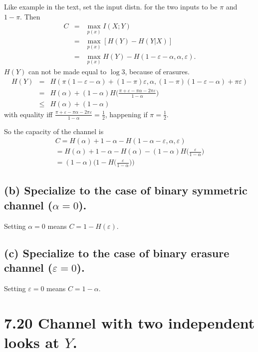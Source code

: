 \documentclass[12pt]{article}
\begin{document}
Like example in the text, set the input distn. for the two inputs to be $\pi$ and $1-\pi$. Then
\begin{eqnarray*}
    C &=& \max_{p(x)}I(X;Y) \\
    &=& \max_{p(x)}[H(Y) - H(Y|X)] \\
    &=& \max_{p(x)}H(Y) - H(1-\varepsilon-\alpha,\alpha,\varepsilon).
\end{eqnarray*}
$H(Y)$ can not be made equal to $\log 3$, because of erasures. 
\begin{eqnarray*}
    H(Y) &=& H( \pi(1-\varepsilon-\alpha) + (1-\pi)\varepsilon,\alpha,(1-\pi)(1-\varepsilon-\alpha) + \pi\varepsilon ) \\
    &=& H(\alpha) + (1-\alpha)H\bigg(\frac{\pi+\varepsilon -\pi\alpha-2\pi\varepsilon}{1-\alpha}\bigg) \\
    &\le& H(\alpha) + (1-\alpha)
\end{eqnarray*}
with equality iff $\frac{\pi+\varepsilon -\pi\alpha-2\pi\varepsilon}{1-\alpha} = \frac{1}{2}$, happening if $\pi = \frac{1}{2}$.

So the capacity of the channel is
\begin{eqnarray*}
    C = H(\alpha) + 1 - \alpha - H(1-\alpha-\varepsilon,\alpha,\varepsilon) \\
    = H(\alpha) + 1 - \alpha - H(\alpha) - (1-\alpha) H\bigg(\frac{\varepsilon}{1-\alpha}\bigg) \\
    = (1-\alpha) \bigg(1 - H\bigg(\frac{\varepsilon}{1-\alpha}\bigg)\bigg)
\end{eqnarray*}

\subsection*{(b) Specialize to the case of binary symmetric channel ($\alpha = 0$).}

Setting $\alpha = 0$ means $C=1-H(\varepsilon)$.

\subsection*{(c) Specialize to the case of binary erasure channel ($\varepsilon = 0$).}
Setting $\varepsilon = 0$ means $C=1-\alpha$.

\section*{7.20 Channel with two independent looks at $Y$.}
\end{document}
